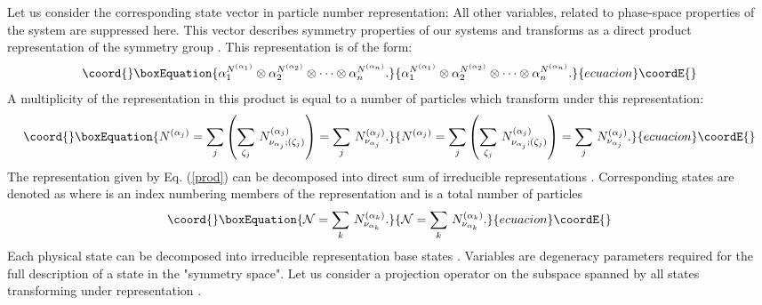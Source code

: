 \documentclass[a4paper]{article}
\begin{document}
Let us consider the corresponding state vector in particle number
representation: \coordHE{} All other
variables, related to phase-space properties of the system are
suppressed here. This vector describes symmetry properties of our
systems and transforms as a direct product representation of the
symmetry group \coordHE{}. This representation is of the form:
\begin{equation}\coord{}\boxEquation{\label{prod}
\alpha_1^{N^{(\alpha_1)}} \otimes \alpha_2^{N^{(\alpha_2)}}
\otimes \cdots \otimes \alpha_n^{N^{(\alpha_n)}}.
}{\alpha_1^{N^{(\alpha_1)}} \otimes \alpha_2^{N^{(\alpha_2)}}
\otimes \cdots \otimes \alpha_n^{N^{(\alpha_n)}}.
}{ecuacion}\coordE{}\end{equation}
A multiplicity \coordHE{} of the representation \coordHE{}
in this product is equal to a number of particles which transform
under this representation:
\begin{equation}\coord{}\boxEquation{
N^{(\alpha_j)} = \sum_j\left(\sum_{\zeta_j}\,
N^{(\alpha_j)}_{\nu_{\alpha_j};(\zeta_j)}\right)= \sum_j\,
N^{(\alpha_j)}_{\nu_{\alpha_j}} .
 \label{pnumber}
}{
N^{(\alpha_j)} = \sum_j\left(\sum_{\zeta_j}\,
N^{(\alpha_j)}_{\nu_{\alpha_j};(\zeta_j)}\right)= \sum_j\,
N^{(\alpha_j)}_{\nu_{\alpha_j}} .
 }{ecuacion}\coordE{}\end{equation}
The representation given by Eq. (\ref{prod}) can be decomposed
into direct sum of irreducible representations \coordHE{}.
Corresponding states are denoted as \coordHE{} where
\coordHE{} is an index numbering members of the
representation \myHighlight{$\Lambda$}\coordHE{} and \coordHE{} is a total number of
particles
\begin{equation}\coord{}\boxEquation{
{\mathcal N}=\sum_k\,
N^{(\alpha_k)}_{\nu_{\alpha_k}}.
\label{number}
}{
{\mathcal N}=\sum_k\,
N^{(\alpha_k)}_{\nu_{\alpha_k}}.
}{ecuacion}\coordE{}\end{equation}
Each physical state can be decomposed into irreducible
representation base states \coordHE{}. Variables \myHighlight{$\xi_{\Lambda}$}\coordHE{} are degeneracy parameters required
for the full description of a state in the "symmetry space". Let
us consider a projection operator \coordHE{} on the
subspace spanned by all states transforming under representation
\myHighlight{$\Lambda$}\coordHE{}.
\end{document}
